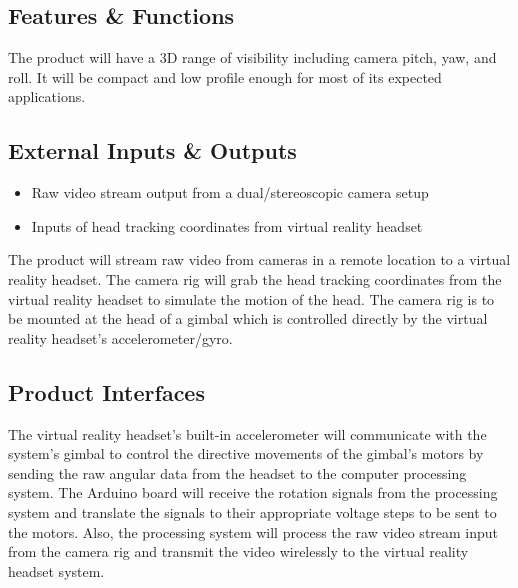 
\subsection{Features \& Functions}
The product will have a 3D range of visibility including camera pitch, yaw, and roll. It will be compact and low profile enough for most of its expected applications.

\subsection{External Inputs \& Outputs}
\begin{itemize}
\item Raw video stream output from a dual/stereoscopic camera setup
\item Inputs of head tracking coordinates from virtual reality headset
\end{itemize}
The product will stream raw video from cameras in a remote location to a virtual reality headset. The camera rig will grab the head tracking coordinates from the virtual reality headset to simulate the motion of the head. The camera rig is to be mounted at the head of a gimbal which is controlled directly by the virtual reality headset's accelerometer/gyro.

\subsection{Product Interfaces}
The virtual reality headset's built-in accelerometer will communicate with the system's gimbal to control the directive movements of the gimbal's motors by sending the raw angular data from the headset to the computer processing system. The Arduino board will receive the rotation signals from the processing system and translate the signals to their appropriate voltage steps to be sent to the motors. Also, the processing system will process the raw video stream input from the camera rig and transmit the video wirelessly to the virtual reality headset system.